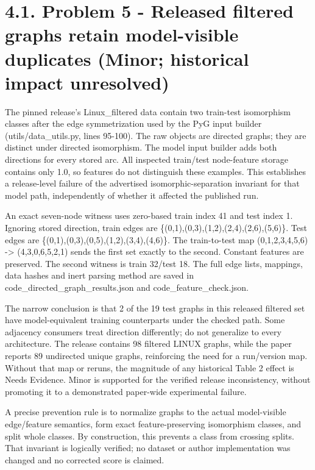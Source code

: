 \documentclass[10pt]{article}
\begin{document}
\section*{4.1. Problem 5 - Released filtered graphs retain model-visible duplicates (Minor; historical impact unresolved)}
The pinned release’s Linux\_filtered data contain two train-test isomorphism classes after the edge symmetrization used by the PyG input builder (utils/data\_utils.py, lines 95-100). The raw objects are directed graphs; they are distinct under directed isomorphism. The model input builder adds both directions for every stored arc. All inspected train/test node-feature storage contains only 1.0, so features do not distinguish these examples. This establishes a release-level failure of the advertised isomorphic-separation invariant for that model path, independently of whether it affected the published run.\par
An exact seven-node witness uses zero-based train index 41 and test index 1. Ignoring stored direction, train edges are \{(0,1),(0,3),(1,2),(2,4),(2,6),(5,6)\}. Test edges are \{(0,1),(0,3),(0,5),(1,2),(3,4),(4,6)\}. The train-to-test map (0,1,2,3,4,5,6) -> (4,3,0,6,5,2,1) sends the first set exactly to the second. Constant features are preserved. The second witness is train 32/test 18. The full edge lists, mappings, data hashes and inert parsing method are saved in code\_directed\_graph\_results.json and code\_feature\_check.json.\par
The narrow conclusion is that 2 of the 19 test graphs in this released filtered set have model-equivalent training counterparts under the checked path. Some adjacency consumers treat direction differently; do not generalize to every architecture. The release contains 98 filtered LINUX graphs, while the paper reports 89 undirected unique graphs, reinforcing the need for a run/version map. Without that map or reruns, the magnitude of any historical Table 2 effect is Needs Evidence. Minor is supported for the verified release inconsistency, without promoting it to a demonstrated paper-wide experimental failure.\par
A precise prevention rule is to normalize graphs to the actual model-visible edge/feature semantics, form exact feature-preserving isomorphism classes, and split whole classes. By construction, this prevents a class from crossing splits. That invariant is logically verified; no dataset or author implementation was changed and no corrected score is claimed.\par
\end{document}
